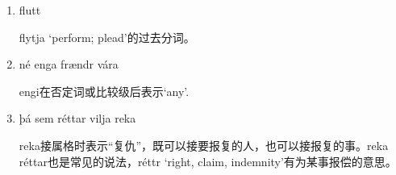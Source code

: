 \begin{grammar*}{}
  \begin{enumerate}[leftmargin=*]
    \item flutt

          flytja `perform; plead'的过去分词。

    \item né enga frændr vára

          engi在否定词或比较级后表示`any'.

    \item þá sem réttar vilja reka

          reka接属格时表示“复仇”，既可以接要报复的人，也可以接报复的事。reka réttar也是常见的说法，réttr `right, claim, indemnity'有为某事报偿的意思。

  \end{enumerate}

\end{grammar*}



